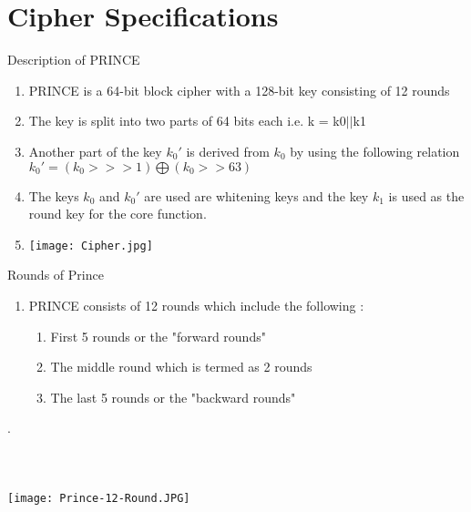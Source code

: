\section{Cipher Specifications}
\begin{frame}{Description of PRINCE}
\begin{enumerate}
    \item PRINCE is a 64-bit block cipher with a 128-bit key consisting of 12 rounds
    \pause
    \item The key is split into two
parts of 64 bits each i.e. k = k0$||$k1
     \pause 
     \item Another part of the key $k_0'$ is derived from $k_0$ by using the following relation 
     $k_0' = (k_0 >>> 1) \bigoplus (k_0 >> 63)$
     \pause
     \item The keys $k_0$ and $k_0'$ are used are whitening keys and the key $k_1$ is used as the round key for the core function. \\
     \pause
     \item \texttt{[image: Cipher.jpg]}
\end{enumerate}


\end{frame}

\begin{frame}{Rounds of Prince}
\begin{enumerate}
    \item PRINCE consists of 12 rounds which include the following :
    \begin{enumerate}
        \item First 5 rounds or the "forward rounds"
        \item The middle round which is termed as 2 rounds
        \item The last 5 rounds or the "backward rounds"
    \end{enumerate} 
 
\end{enumerate}.  \\ \\ \\ \\
      \texttt{[image: Prince-12-Round.JPG]}
\end{frame}

